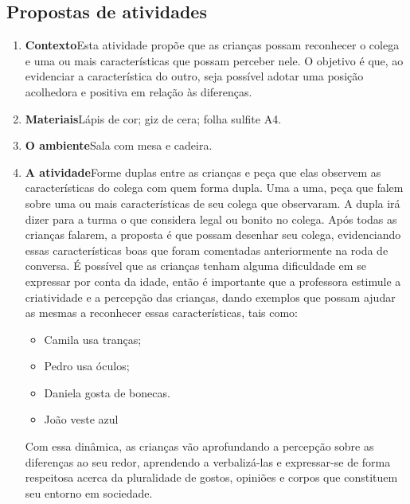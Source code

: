 \documentclass[11pt]{extarticle}
\begin{document}
\subsection{Propostas de atividades}



\begin{enumerate}
\item \textbf{Contexto}\quad Esta atividade propõe que as crianças possam reconhecer o colega e uma ou mais características que possam perceber nele. O objetivo é que, ao evidenciar a característica do outro, seja possível adotar uma posição acolhedora e positiva em relação às diferenças.

\item \textbf{Materiais}\quad Lápis de cor; giz de cera; folha sulfite A4.

\item \textbf{O ambiente}\quad Sala com mesa e cadeira.

\item \textbf{A atividade}\quad Forme duplas entre as crianças e peça que elas observem as características do colega com quem forma dupla. Uma a uma, peça que falem sobre uma ou mais características de seu colega que observaram. A dupla irá dizer para a turma o que considera legal ou bonito no colega. Após todas as crianças falarem, a proposta é que possam desenhar seu colega, evidenciando essas características boas que foram comentadas anteriormente na roda de conversa. É possível que as crianças tenham alguma dificuldade em se expressar por conta da idade, então é importante que a professora estimule a criatividade e a percepção das crianças, dando exemplos que possam ajudar as mesmas a reconhecer essas características, tais como:

\begin{itemize}
\item Camila usa tranças;
\item Pedro usa óculos;
\item Daniela gosta de bonecas.
\item João veste azul
\end{itemize}

Com essa dinâmica, as crianças vão aprofundando a percepção sobre as diferenças ao seu redor, aprendendo a verbalizá-las e expressar-se de forma respeitosa acerca da pluralidade de gostos, opiniões e corpos que constituem seu entorno em sociedade. 


\end{enumerate}
\end{document}
